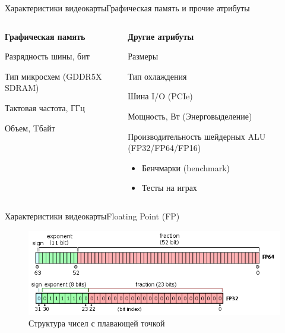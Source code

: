 \documentclass{beamer}
\begin{document}
\begin{frame}{Характеристики видеокарты}{Графическая память и прочие атрибуты}
	\begin{columns}
		\begin{column}{0.5\textwidth}
			\textbf{Графическая память}
			
			Разрядность шины, бит
			
			Тип микросхем (GDDR5X SDRAM)
			
			Тактовая частота, ГГц
			
			Объем, Tбайт
		\end{column}
		\begin{column}{0.5\textwidth}
			\textbf{Другие атрибуты}
			
			Размеры
			
			Тип охлаждения
			
			Шина I/O (PCIe)
			
			Мощность, Вт (Энерговыделение)
			
			Производительность шейдерных  ALU (FP32/FP64/FP16)
			\begin{itemize}
				\item 
				Бенчмарки (benchmark)
				\item 
				Тесты на играх
			\end{itemize}
			
		\end{column}
	\end{columns}
\end{frame}


\begin{frame}{ Характеристики видеокарты}{Floating Point (FP)}
	\begin{figure} 
		\includegraphics[width=\textwidth]{images/Floating_Point_structure.png}
		\caption {Структура чисел с плавающей точкой}
	\end{figure}
	
\end{frame}
\end{document}
